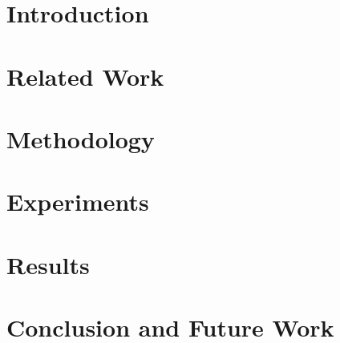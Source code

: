 \documentclass[10pt,twocolumn,letterpaper]{article}
\begin{document}
\begin{abstract}
    
\end{abstract}

\section{Introduction}

\section{Related Work}

%
%
\section{Methodology}

\section{Experiments}

\section{Results}

\vspace{-0.08in}
\section{Conclusion and Future Work}


{\small


}
\end{document}
